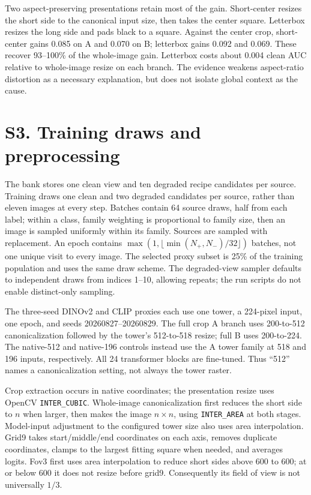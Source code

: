\documentclass[letterpaper]{article}
\begin{document}
\newpage
Two aspect-preserving presentations retain most of the gain. Short-center resizes the short side to the canonical input size, then takes the center square. Letterbox resizes the long side and pads black to a square. Against the center crop, short-center gains 0.085 on A and 0.070 on B; letterbox gains 0.092 and 0.069. These recover 93--100\% of the whole-image gain. Letterbox costs about 0.004 clean AUC relative to whole-image resize on each branch. The evidence weakens aspect-ratio distortion as a necessary explanation, but does not isolate global context as the cause.

\section{S3. Training draws and preprocessing}

The bank stores one clean view and ten degraded recipe candidates per source. Training draws one clean and two degraded candidates per source, rather than eleven images at every step. Batches contain 64 source draws, half from each label; within a class, family weighting is proportional to family size, then an image is sampled uniformly within its family. Sources are sampled with replacement. An epoch contains $\max(1,\lfloor\min(N_+,N_-)/32\rfloor)$ batches, not one unique visit to every image. The selected proxy subset is 25\% of the training population and uses the same draw scheme. The degraded-view sampler defaults to independent draws from indices 1--10, allowing repeats; the run scripts do not enable distinct-only sampling.

The three-seed DINOv2 and CLIP proxies each use one tower, a 224-pixel input, one epoch, and seeds 20260827--20260829. The full crop A branch uses 200-to-512 canonicalization followed by the tower's 512-to-518 resize; full B uses 200-to-224. The native-512 and native-196 controls instead use the A tower family at 518 and 196 inputs, respectively. All 24 transformer blocks are fine-tuned. Thus ``512'' names a canonicalization setting, not always the tower raster.

Crop extraction occurs in native coordinates; the presentation resize uses OpenCV \texttt{INTER\_CUBIC}. Whole-image canonicalization first reduces the short side to $n$ when larger, then makes the image $n\times n$, using \texttt{INTER\_AREA} at both stages. Model-input adjustment to the configured tower size also uses area interpolation. Grid9 takes start/middle/end coordinates on each axis, removes duplicate coordinates, clamps to the largest fitting square when needed, and averages logits. Fov3 first uses area interpolation to reduce short sides above 600 to 600; at or below 600 it does not resize before grid9. Consequently its field of view is not universally $1/3$.
\end{document}
